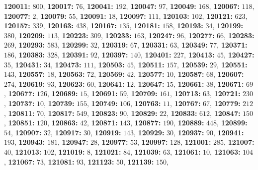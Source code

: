 \textsf{\bfseries 120011:} $800$, \textsf{\bfseries 120017:} $76$, \textsf{\bfseries 120041:} $192$, \textsf{\bfseries 120047:} $97$, \textsf{\bfseries 120049:} $168$, \textsf{\bfseries 120067:} $118$, \textsf{\bfseries 120077:} $2$, \textsf{\bfseries 120079:} $55$, \textsf{\bfseries 120091:} $18$, \textsf{\bfseries 120097:} $111$, \textsf{\bfseries 120103:} $102$, \textsf{\bfseries 120121:} $623$, \textsf{\bfseries 120157:} $339$, \textsf{\bfseries 120163:} $438$, \textsf{\bfseries 120167:} $135$, \textsf{\bfseries 120181:} $158$, \textsf{\bfseries 120193:} $34$, \textsf{\bfseries 120199:} $380$, \textsf{\bfseries 120209:} $113$, \textsf{\bfseries 120223:} $309$, \textsf{\bfseries 120233:} $163$, \textsf{\bfseries 120247:} $96$, \textsf{\bfseries 120277:} $66$, \textsf{\bfseries 120283:} $269$, \textsf{\bfseries 120293:} $583$, \textsf{\bfseries 120299:} $32$, \textsf{\bfseries 120319:} $67$, \textsf{\bfseries 120331:} $63$, \textsf{\bfseries 120349:} $77$, \textsf{\bfseries 120371:} $186$, \textsf{\bfseries 120383:} $328$, \textsf{\bfseries 120391:} $92$, \textsf{\bfseries 120397:} $140$, \textsf{\bfseries 120401:} $227$, \textsf{\bfseries 120413:} $45$, \textsf{\bfseries 120427:} $35$, \textsf{\bfseries 120431:} $34$, \textsf{\bfseries 120473:} $111$, \textsf{\bfseries 120503:} $45$, \textsf{\bfseries 120511:} $157$, \textsf{\bfseries 120539:} $29$, \textsf{\bfseries 120551:} $143$, \textsf{\bfseries 120557:} $18$, \textsf{\bfseries 120563:} $72$, \textsf{\bfseries 120569:} $42$, \textsf{\bfseries 120577:} $10$, \textsf{\bfseries 120587:} $68$, \textsf{\bfseries 120607:} $274$, \textsf{\bfseries 120619:} $93$, \textsf{\bfseries 120623:} $60$, \textsf{\bfseries 120641:} $12$, \textsf{\bfseries 120647:} $15$, \textsf{\bfseries 120661:} $38$, \textsf{\bfseries 120671:} $69$, \textsf{\bfseries 120677:} $126$, \textsf{\bfseries 120689:} $15$, \textsf{\bfseries 120691:} $59$, \textsf{\bfseries 120709:} $161$, \textsf{\bfseries 120713:} $63$, \textsf{\bfseries 120721:} $230$, \textsf{\bfseries 120737:} $10$, \textsf{\bfseries 120739:} $155$, \textsf{\bfseries 120749:} $106$, \textsf{\bfseries 120763:} $11$, \textsf{\bfseries 120767:} $67$, \textsf{\bfseries 120779:} $212$, \textsf{\bfseries 120811:} $70$, \textsf{\bfseries 120817:} $549$, \textsf{\bfseries 120823:} $90$, \textsf{\bfseries 120829:} $22$, \textsf{\bfseries 120833:} $612$, \textsf{\bfseries 120847:} $150$, \textsf{\bfseries 120851:} $120$, \textsf{\bfseries 120863:} $42$, \textsf{\bfseries 120871:} $143$, \textsf{\bfseries 120877:} $190$, \textsf{\bfseries 120889:} $448$, \textsf{\bfseries 120899:} $54$, \textsf{\bfseries 120907:} $32$, \textsf{\bfseries 120917:} $30$, \textsf{\bfseries 120919:} $143$, \textsf{\bfseries 120929:} $30$, \textsf{\bfseries 120937:} $90$, \textsf{\bfseries 120941:} $193$, \textsf{\bfseries 120943:} $181$, \textsf{\bfseries 120947:} $28$, \textsf{\bfseries 120977:} $53$, \textsf{\bfseries 120997:} $128$, \textsf{\bfseries 121001:} $285$, \textsf{\bfseries 121007:} $40$, \textsf{\bfseries 121013:} $102$, \textsf{\bfseries 121019:} $8$, \textsf{\bfseries 121021:} $84$, \textsf{\bfseries 121039:} $63$, \textsf{\bfseries 121061:} $10$, \textsf{\bfseries 121063:} $104$, \textsf{\bfseries 121067:} $73$, \textsf{\bfseries 121081:} $93$, \textsf{\bfseries 121123:} $50$, \textsf{\bfseries 121139:} $150$, 
